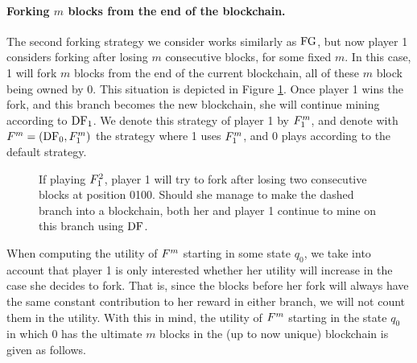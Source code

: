 \paragraph{Forking $m$ blocks from the end of the blockchain.} The second forking strategy we consider works similarly as $\text{\rm FG}$, but now player 1 considers forking after losing $m$ consecutive blocks, for some fixed $m$. In this case, 1 will fork $m$ blocks from the end of the current blockchain, all of these $m$ block being owned by 0. This situation is depicted in Figure \ref{fig-fork_m}. Once player 1 wins the fork, and this branch becomes the new blockchain, she will continue mining according to $\text{\rm DF}_1$. We denote this strategy of player 1 by $F^{m}_1$, and denote with $F^{m}=(\text{\rm DF}_0,F^{m}_1)$ the strategy where 1 uses $F^{m}_1$, and 0 plays according to the default strategy.

\begin{figure}
\begin{center}
\end{center}
\caption{If playing $F^{2}_1$, player 1 will try to fork after losing two consecutive blocks at position 0100. Should she manage to make the dashed branch into a blockchain, both her and player 1 continue to mine on this branch using $\text{\rm DF}$.}
\label{fig-fork_m}
\end{figure}

When computing the utility of $F^{m}$ starting in some state $q_0$, we take into account that player 1 is only interested whether her utility will increase in the case she decides to fork. That is, since the blocks before her fork will always have the same constant contribution to her reward in either branch, we will not count them in the utility. With this in mind, the utility of $F^{m}$ starting in the state $q_0$ in which 0 has the ultimate $m$ blocks in the (up to now unique) blockchain is given as follows.

